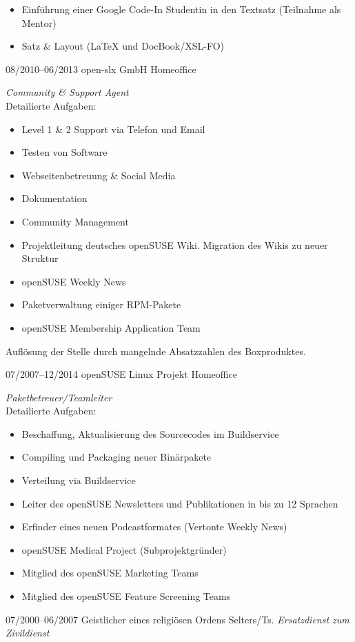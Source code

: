 \documentclass[a4paper,latin]{friggeri-cv} %
\begin{document}
\begin{entrylist}
{\begin{itemize}
\item Einführung einer Google Code-In Studentin in den Textsatz (Teilnahme als Mentor)
\item Satz \& Layout (\LaTeX{} und DocBook/XSL-FO)
\end{itemize}
}
\entry
{08/2010--06/2013}
{open-slx GmbH}
{Homeoffice}
{\emph{Community \& Support Agent} \\
Detailierte Aufgaben:
\begin{itemize}
\item Level 1 \& 2 Support via Telefon und Email
\item Testen von Software
\item Webseitenbetreuung \& Social Media
\item Dokumentation
\item Community Management
\item Projektleitung deutsches openSUSE Wiki. Migration des Wikis zu neuer Struktur
\item openSUSE Weekly News
\item Paketverwaltung einiger RPM-Pakete
\item openSUSE Membership Application Team
\end{itemize}
Auflösung der Stelle durch mangelnde Absatzzahlen des Boxproduktes.
}
\end{entrylist}
\begin{entrylist}
\entry
{07/2007--12/2014}
{openSUSE Linux Projekt}
{Homeoffice}
{\emph{Paketbetreuer/Teamleiter}\\
Detailierte Aufgaben:
\begin{itemize}
\item Beschaffung, Aktualisierung des Sourcecodes im Buildservice
\item Compiling und Packaging neuer Binärpakete
\item Verteilung via Buildservice
\item Leiter des openSUSE Newsletters und Publikationen in bis zu 12 Sprachen
\item Erfinder eines neuen Podcastformates (Vertonte Weekly News)
\item openSUSE Medical Project (Subprojektgründer)
\item Mitglied des openSUSE Marketing Teams
\item Mitglied des openSUSE Feature Screening Teams
\end{itemize}
}
\entry
{07/2000--06/2007}
{Geistlicher eines religiösen Ordens}
{Selters/Ts.}
{\emph{Ersatzdienst zum Zivildienst}}
\end{entrylist}
\end{document}
